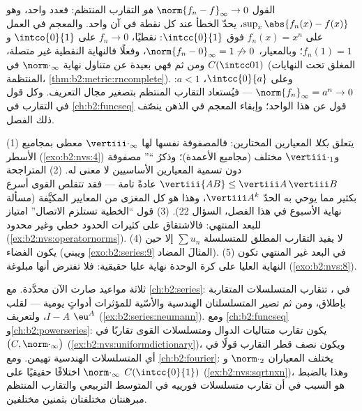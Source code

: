 \begin{example}\label{ex:b2:nvs:uniformdictionary}
القول $\norm{f_n - f}_\infty \to 0$ \emph{هو} التقارب
المنتظم: فعدد واحد، وهو $\sup_x\abs{f_n(x) - f(x)}$، يحدّ
الخطأ عند كل نقطة في آن واحد. والمعجم في
العمل على $f_n(x) = x^n$ فوق $\intcc{0}{1}$: نقطيًا، $f_n
\to 0$ على $\intco{0}{1}$ و$f_n(1) = 1$؛ وبالمعيار،
$\norm{f_n - 0}_\infty = 1 \not\to 0$، وفعلًا فالنهاية النقطية
غير متصلة، ومن ثم فهي بعيدة عن متناول نهاية 
$\norm\cdot_\infty$ في $C(\intcc01)$ (المغلق
تحت النهايات المنتظمة، \cref{thm:b2:metric:rncomplete}). وعلى
$\intcc{0}{a}$، $a < 1$: $\norm{f_n}_\infty = a^n \to 0$ ---
فيُستعاد التقارب المنتظم بتصغير مجال التعريف. وكل
قول في التقارب في \cref{ch:b2:funcseq} قول
عن هذا  الواحد؛ وإبقاء المعجم في الذهن ينصّف
ذلك الفصل.
\end{example}

\begin{remark}\label{rem:b2:nvs:pitfalls}
(1) يتعلق  \emph{بكلا} المعيارين المختارين: فالمصفوفة
نفسها لها $\vertiii\cdot_\infty$ معطى بمجاميع الأسطر
(\cref{exo:b2:nvs:4}) و$\vertiii\cdot_1$ مختلف (مجاميع
الأعمدة)؛ وذكرُ ``'' مصفوفة دون تسمية
المعيارين الأساسيين لا معنى له. (2) المتراجحة $\vertiii{AB} \leq
\vertiii A\,\vertiii B$ عادةً تامة ---
فقد تتقلص القوى أسرع بكثير مما يوحي به الحدّ $\vertiii A^k$،
وهذا هو كل المغزى من المعايير المكيَّفة (مسألة نهاية
الأسبوع في هذا الفصل، السؤال 22). (3) قول ``الخطية تستلزم
الاتصال'' امتياز للبعد المنتهي: فالاشتقاق
على كثيرات الحدود خطي وغير محدود
(\cref{ex:b2:nvs:operatornorms}). (4) لا يفيد التقارب المطلق
للمتسلسلة $\sum u_n$ إلا حين يكون الفضاء 
(ويبني \cref{exo:b2:series:9} المثالَ المضاد). (5) في
البعد غير المنتهي تكون النهاية العليا على كرة الوحدة نهاية عليا
حقيقية: فلا تفترض أنها مبلوغة
(\cref{exo:b2:nvs:8}).
\end{remark}

\begin{remark}\label{rem:b2:nvs:perspectives}
ثلاثة مواعيد صارت الآن محدَّدة. مع \cref{ch:b2:series}: في
، تتقارب المتسلسلات المتقاربة بإطلاق، ومن ثم تصير
المتسلسلتان الهندسية والأسّية للمؤثرات أدواتٍ يومية ---
لقلب $I - A$، ولتعريف $\eu^{A}$
(\cref{ex:b2:series:neumann}). ومع
\cref{ch:b2:funcseq} و\cref{ch:b2:powerseries}: يكون تقارب
متتاليات الدوال ومتسلسلات القوى تقاربًا في
$\bigl(C, \norm\cdot_\infty\bigr)$
(\cref{ex:b2:nvs:uniformdictionary})، ويكون نصف قطر
التقارب قولًا في أي المتسلسلات الهندسية
تهيمن. ومع \cref{ch:b2:fourier}: يختلف المعياران
$\norm\cdot_2$ و$\norm\cdot_\infty$ اختلافًا حقيقيًا على
$C(\intcc{0}{1})$ (\cref{ex:b2:nvs:sqrtnxn})، وهذا بالضبط
هو السبب في أن تقارب متسلسلات فورييه في المتوسط التربيعي والتقارب
المنتظم مبرهنتان مختلفتان بثمنين مختلفين.
\end{remark}


